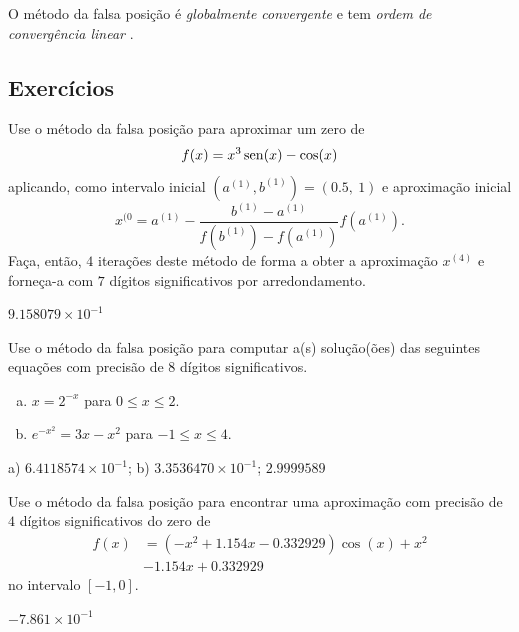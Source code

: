 \begin{obs}
  O método da falsa posição é \emph{globalmente convergente} e tem \emph{ordem de convergência linear} \cite[Seção 8.3]{Ralston2001a}.
\end{obs}

\subsection{Exercícios}

\begin{exer}
  Use o método da falsa posição para aproximar um zero de
  \begin{equation}
    f(x) = x^3\operatorname{sen}(x)-\cos(x)
  \end{equation}
  aplicando, como intervalo inicial $(a^{(1)}, b^{(1)}) = (0.5, ~1)$ e aproximação inicial
  \begin{equation}
    x^{(0} = a^{(1)} - \frac{b^{(1)}-a^{(1)}}{f(b^{(1)})-f(a^{(1)})}f(a^{(1)}).
  \end{equation}
  Faça, então, $4$ iterações deste método de forma a obter a aproximação $x^{(4)}$ e forneça-a com $7$ dígitos significativos por arredondamento.
\end{exer}
\begin{resp}
  $9.158079\times 10^{-1}$
\end{resp}

\begin{exer}
  Use o método da falsa posição para computar a(s) solução(ões) das seguintes equações com precisão de 8 dígitos significativos.
  \begin{enumerate}[a)]
  \item $x = 2^{-x}$ para $0\leq x \leq 2$.
  \item $e^{-x^2} = 3x - x^2$ para $-1\leq x\leq 4$.
  \end{enumerate}
\end{exer}
\begin{resp}
  a) $6.4118574\times 10^{-1}$; b) $3.3536470\times 10^{-1}$; $2.9999589$
\end{resp}

\begin{exer}
  Use o método da falsa posição para encontrar uma aproximação com precisão de $4$ dígitos significativos do zero de 
  \begin{equation}
    \begin{aligned}
      f(x) &= (-x^2+1.154x-0.332929)\cos(x) + x^2 \\
           &- 1.154x + 0.332929
    \end{aligned}
\end{equation}
  no intervalo $[-1, 0]$.
\end{exer}
\begin{resp}
  $-7.861\times 10^{-1}$
\end{resp}


